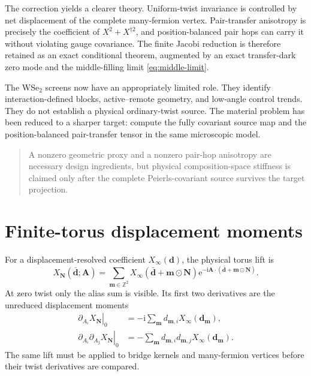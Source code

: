 \documentclass[11pt]{article}
\theoremstyle{remark}
\newcommand{\I}{\mathrm i}
\newcommand{\e}{\mathrm e}
\begin{document}
The correction yields a clearer theory.  Uniform-twist invariance is controlled by net displacement of the complete many-fermion vertex.  Pair-transfer anisotropy is precisely the coefficient of $X^2+X^{\dagger2}$, and position-balanced pair hops can carry it without violating gauge covariance.  The finite Jacobi reduction is therefore retained as an exact conditional theorem, augmented by an exact transfer-dark zero mode and the middle-filling limit \eqref{eq:middle-limit}.

The WSe$_2$ screens now have an appropriately limited role.  They identify interaction-defined blocks, active--remote geometry, and low-angle control trends.  They do not establish a physical ordinary-twist source.  The material problem has been reduced to a sharper target: compute the fully covariant source map and the position-balanced pair-transfer tensor in the same microscopic model.

\begin{quote}
A nonzero geometric proxy and a nonzero pair-hop anisotropy are necessary design ingredients, but physical composition-space stiffness is claimed only after the complete Peierls-covariant source survives the target projection.
\end{quote}

\appendix

\section{Finite-torus displacement moments}
\label{app:lift}

For a displacement-resolved coefficient $X_\infty(\bm d)$, the physical torus lift is
\begin{equation}
X_{\bm N}(\bar{\bm d};\bm A)=
\sum_{\bm m\in\mathbb Z^2}
X_\infty(\bar{\bm d}+\bm m\odot\bm N)
\e^{-\I\bm A\cdot(\bar{\bm d}+\bm m\odot\bm N)}.
\end{equation}
At zero twist only the alias sum is visible.  Its first two derivatives are the unreduced displacement moments
\begin{align}
\left.\partial_{A_i}X_{\bm N}\right|_0
&=-\I\sum_{\bm m}d_{\bm m,i}X_\infty(\bm d_{\bm m}),\\
\left.\partial_{A_i}\partial_{A_j}X_{\bm N}\right|_0
&=-\sum_{\bm m}d_{\bm m,i}d_{\bm m,j}X_\infty(\bm d_{\bm m}).
\end{align}
The same lift must be applied to bridge kernels and many-fermion vertices before their twist derivatives are compared.
\end{document}
